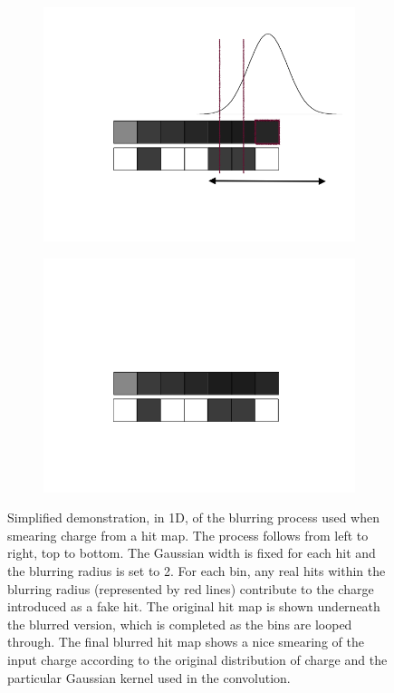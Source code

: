 \begin{figure}
\begin{subfigure}[t]{0.3\linewidth}
  \end{subfigure}
  \hfill
  \begin{subfigure}[t]{0.3\linewidth}
    \centering
    \includegraphics[width=\textwidth]{blurring8.png}
  \end{subfigure}
  \hfill
  \begin{subfigure}[t]{0.3\linewidth}
    \centering
    \includegraphics[width=\textwidth]{blurring9.png}
  \end{subfigure}
  \caption[Simplified demonstration, in 1D, of the blurring process used when smearing charge from a hit map.]{Simplified demonstration, in 1D, of the blurring process used when smearing charge from a hit map.  The process follows from left to right, top to bottom.  The Gaussian width is fixed for each hit and the blurring radius is set to 2.  For each bin, any real hits within the blurring radius (represented by red lines) contribute to the charge introduced as a fake hit.  The original hit map is shown underneath the blurred version, which is completed as the bins are looped through.  The final blurred hit map shows a nice smearing of the input charge according to the original distribution of charge and the particular Gaussian kernel used in the convolution.}
  \label{fig:BlurringProcess}
\end{figure}

